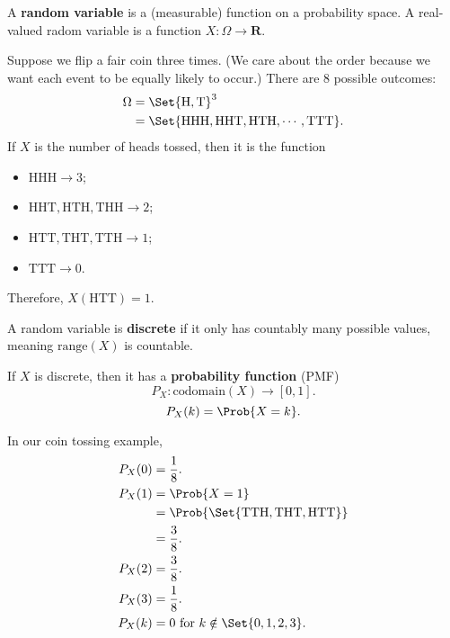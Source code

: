 \begin{Definition}{}{}
    A \textbf{random variable} is a (measurable) function
    on a probability space. A real-valued radom variable is a function
    $ X\colon \Omega\to\mathbf{R} $.
\end{Definition}
\begin{Example}{}{}
    Suppose we flip a fair coin three times.
    (We care about the order because
    we want each event to be equally likely to occur.)
    There are $ 8 $ possible outcomes:
    \begin{align*}
        \Omega
         & =\Set{\text{H},\text{T}}^3              \\
         & =\Set{\text{HHH},\text{HHT},\text{HTH},
            \cdots,\text{TTT}}.
    \end{align*}
    If $ X $ is the number of heads tossed, then it is the function
    \begin{itemize}
        \item $ \text{HHH}\to 3 $;
        \item $ \text{HHT},\text{HTH},\text{THH}\to 2 $;
        \item $ \text{HTT},\text{THT},\text{TTH}\to 1 $;
        \item $ \text{TTT}\to 0 $.
    \end{itemize}
    Therefore, $ X(\text{HTT})=1 $.
\end{Example}
\begin{Definition}{}{}
    A random variable is \textbf{discrete} if it only has countably
    many possible values, meaning
    $ \text{range}(X) $ is countable.
\end{Definition}
\begin{Definition}{}{}
    If $ X $ is discrete, then it has a \textbf{probability
        function} (PMF)
    \[ P_X\colon \text{codomain}(X)\to[0,1]. \]
    \[ P_X(k)=\Prob{X=k}. \]
\end{Definition}
\begin{Example}{}{}
    In our coin tossing example,
    \begin{align*}
        P_X(0) & =\frac{1}{8}.                                  \\
        P_X(1)
               & =\Prob{X=1}                                    \\
               & =\Prob{\Set{\text{TTH},\text{THT},\text{HTT}}} \\
               & =\frac{3}{8}.                                  \\
        P_X(2) & =\frac{3}{8}.                                  \\
        P_X(3) & =\frac{1}{8}.                                  \\
        P_X(k) & =0\text{ for } k\notin \Set{0,1,2,3}.
    \end{align*}
\end{Example}
